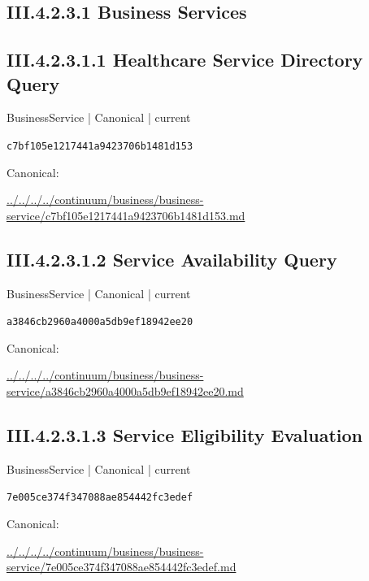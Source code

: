 \documentclass[10pt,a4paper]{article}
\begin{document}
\subsection*{III.4.2.3.1 Business Services}
\subsection*{III.4.2.3.1.1 Healthcare Service Directory Query}
\label{element-c7bf105e1217441a9423706b1481d153}
{\small BusinessService | Canonical | current}\par
\texttt{c7bf105e1217441a9423706b1481d153}\par
Canonical: \par
{\footnotesize\url{../../../../continuum/business/business-service/c7bf105e1217441a9423706b1481d153.md}}\par
\subsection*{III.4.2.3.1.2 Service Availability Query}
\label{element-a3846cb2960a4000a5db9ef18942ee20}
{\small BusinessService | Canonical | current}\par
\texttt{a3846cb2960a4000a5db9ef18942ee20}\par
Canonical: \par
{\footnotesize\url{../../../../continuum/business/business-service/a3846cb2960a4000a5db9ef18942ee20.md}}\par
\subsection*{III.4.2.3.1.3 Service Eligibility Evaluation}
\label{element-7e005ce374f347088ae854442fc3edef}
{\small BusinessService | Canonical | current}\par
\texttt{7e005ce374f347088ae854442fc3edef}\par
Canonical: \par
{\footnotesize\url{../../../../continuum/business/business-service/7e005ce374f347088ae854442fc3edef.md}}\par
\end{document}
